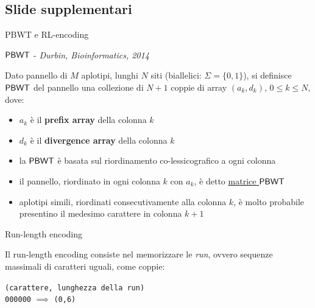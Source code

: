 \documentclass[]{beamer}
\def\PBWT{\mbox{\rm {\sf PBWT}}}
\begin{document}
\subsection{Slide supplementari}
\begin{frame}[plain]{PBWT e RL-encoding}
  \begin{block}{$\PBWT$ - {\footnotesize{\textit{Durbin, Bioinformatics,
            2014}}}} 
    \footnotesize{ Dato pannello di $M$ aplotipi, lunghi $N$ siti (biallelici:
      $\Sigma=\{0,1\}$), si definisce 
      $\PBWT$ del 
      pannello una collezione di $N+1$ coppie di array $(a_k,d_k)$, $0\leq k\leq
      N$, dove:
      \begin{itemize}
        \item $a_k$ è il \textbf{prefix array} della colonna $k$
        \item $d_k$ è il \textbf{divergence array} della colonna $k$
      \end{itemize}}
  \end{block}
  \begin{block}{}
    \footnotesize{\begin{itemize}
        \item la $\PBWT$ è basata sul riordinamento co-lessicografico a ogni
        colonna
        \item il pannello, riordinato in ogni colonna $k$ con $a_k$, è detto
        \underline{matrice $\PBWT$}
        \item aplotipi simili, riordinati consecutivamente alla colonna $k$, è
        molto probabile presentino il medesimo carattere in colonna $k+1$
      \end{itemize}}
  \end{block}
  
  \begin{block}{Run-length encoding}
    \footnotesize{Il run-length encoding consiste nel memorizzare le \textit{run}, ovvero
      sequenze massimali di caratteri uguali, come coppie: \\
      \vspace{-0.3cm}
      \begin{center}
        \texttt{(carattere, lunghezza della run)}\\
        \texttt{000000} $\implies$ \texttt{(0,6)}
      \end{center}}
  \end{block}
\end{frame}
\end{document}
